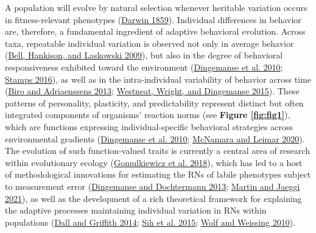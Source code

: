 \documentclass{article}
\begin{document}
A population will evolve by natural selection whenever heritable
variation occurs in fitness-relevant phenotypes
(\protect\hyperlink{ref-Darwin}{Darwin 1859}). Individual differences in
behavior are, therefore, a fundamental ingredient of adaptive behavioral
evolution. Across taxa, repeatable individual variation is observed not
only in average behavior (\protect\hyperlink{ref-Bell2009}{Bell,
Hankison, and Laskowski 2009}), but also in the degree of behavioral
responsiveness exhibited toward the environment
(\protect\hyperlink{ref-Ding2010}{Dingemanse et al. 2010};
\protect\hyperlink{ref-Stamps2016}{Stamps 2016}), as well as in the
intra-individual variability of behavior across time
(\protect\hyperlink{ref-Biro2013}{Biro and Adriaenssens 2013};
\protect\hyperlink{ref-Westneat2015}{Westneat, Wright, and Dingemanse
2015}). These patterns of personality, plasticity, and predictability
represent distinct but often integrated components of organisms'
reaction norms (see \textbf{Figure \ref{fig:fig1}}), which are functions
expressing individual-specific behavioral strategies across
environmental gradients (\protect\hyperlink{ref-Ding2010}{Dingemanse et
al. 2010}; \protect\hyperlink{ref-McNamara2020}{McNamara and Leimar
2020}). The evolution of such function-valued traits is currently a
central area of research within evolutionary ecology
(\protect\hyperlink{ref-Gomulk2018}{Gomulkiewicz et al. 2018}), which
has led to a host of methodological innovations for estimating the RNs
of labile phenotypes subject to measurement error
(\protect\hyperlink{ref-DingDocht2013}{Dingemanse and Dochtermann 2013};
\protect\hyperlink{ref-Martin2021}{Martin and Jaeggi 2021}), as well as
the development of a rich theoretical framework for explaining the
adaptive processes maintaining individual variation in RNs within
populations (\protect\hyperlink{ref-Dall2014}{Dall and Griffith 2014};
\protect\hyperlink{ref-Sih2015}{Sih et al. 2015};
\protect\hyperlink{ref-Wolf2010}{Wolf and Weissing 2010}).
\end{document}
